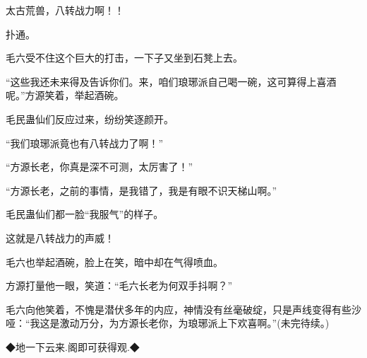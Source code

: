 \begin{this_body}
太古荒兽，八转战力啊！！

扑通。

毛六受不住这个巨大的打击，一下子又坐到石凳上去。

“这些我还未来得及告诉你们。来，咱们琅琊派自己喝一碗，这可算得上喜酒呢。”方源笑着，举起酒碗。

毛民蛊仙们反应过来，纷纷笑逐颜开。

“我们琅琊派竟也有八转战力了啊！”

“方源长老，你真是深不可测，太厉害了！”

“方源长老，之前的事情，是我错了，我是有眼不识天梯山啊。”

毛民蛊仙们都一脸“我服气”的样子。

这就是八转战力的声威！

毛六也举起酒碗，脸上在笑，暗中却在气得喷血。

方源打量他一眼，笑道：“毛六长老为何双手抖啊？”

毛六向他笑着，不愧是潜伏多年的内应，神情没有丝毫破绽，只是声线变得有些沙哑：“我这是激动万分，为方源长老你，为琅琊派上下欢喜啊。”(未完待续。)

◆地一下云来.阁即可获得观.◆

\end{this_body}

